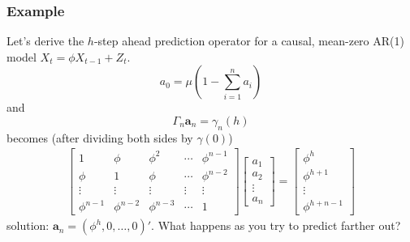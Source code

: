 \documentclass{beamer}
\begin{document}


\begin{frame}
\frametitle{Example}

Let's derive the $h$-step ahead prediction operator for a causal, mean-zero AR(1) model $X_t = \phi X_{t-1} + Z_t$.
\[
a_0 = \mu\left(1 - \sum_{i=1}^n a_i\right)
\]
and
\[
\Gamma_n \mathbf{a}_n = \gamma_n(h)
\]
becomes (after dividing both sides by $\gamma(0)$)
\begin{eqnarray}
\left[ \begin{array}{ccccc}
1 & \phi & \phi^2 & \cdots & \phi^{n-1} \\
\phi & 1 & \phi & \cdots & \phi^{n-2} \\
\vdots & \vdots & \vdots & \vdots & \vdots \\
\phi^{n-1} & \phi^{n-2} & \phi^{n-3} & \cdots & 1
\end{array}\right]
\left[\begin{array}{c}
a_1 \\
a_2 \\
\vdots \\
a_n
\end{array}\right]
=
\left[ \begin{array}{c}
\phi^h \\
\phi^{h+1} \\
\vdots \\
\phi^{h+n-1}
\end{array}\right]
\end{eqnarray}
solution: $\mathbf{a}_n = (\phi^h, 0, \ldots, 0)'$. What happens as you try to predict farther out?
\end{frame}

\end{document}
